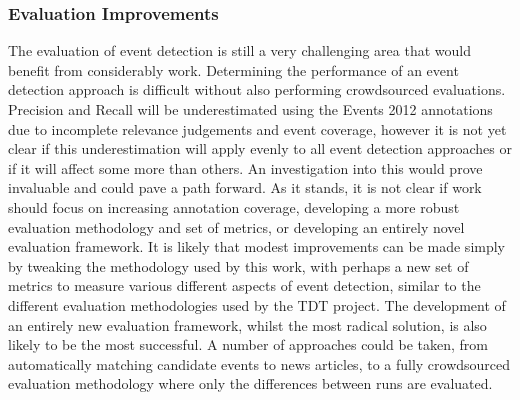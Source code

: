 \subsubsection{Evaluation Improvements}
The evaluation of event detection is still a very challenging area that would benefit from considerably work.
Determining the performance of an event detection approach is difficult without also performing crowdsourced evaluations.
Precision and Recall will be underestimated using the Events 2012 annotations due to incomplete relevance judgements and event coverage, however it is not yet clear if this underestimation will apply evenly to all event detection approaches or if it will affect some more than others.
An investigation into this would prove invaluable  and could pave a path forward.
As it stands, it is not clear if work should focus on increasing annotation coverage, developing a more robust evaluation methodology and set of metrics, or developing an entirely novel evaluation framework.
It is likely that modest improvements can be made simply by tweaking the methodology used by this work, with perhaps a new set of metrics to measure various different aspects of event detection, similar to the different evaluation methodologies used by the TDT project.
The development of an entirely new evaluation framework, whilst the most radical solution, is also likely to be the most successful.
A number of approaches could be taken, from automatically matching candidate events to news articles, to a fully crowdsourced evaluation methodology where only the differences between runs are evaluated.

